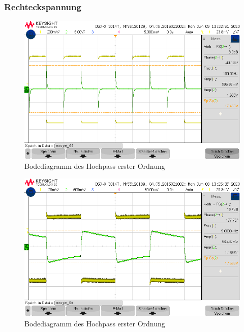 \subsubsection{Rechteckspannung}
\begin{figure}[H]
    \centering
    \includegraphics[width=\costumPicWidth]{Lab_2/Messungen/HP_first_order/scope_66.png}
    \caption{Bodediagramm des Hochpass erster Ordnung}
    \label{fig:Bode_HP_first_order}
\end{figure}
\begin{figure}[H]
    \centering
    \includegraphics[width=\costumPicWidth]{Lab_2/Messungen/HP_first_order/scope_53.png}
    \caption{Bodediagramm des Hochpass erster Ordnung}
    \label{fig:Bode_HP_first_order}
\end{figure}

